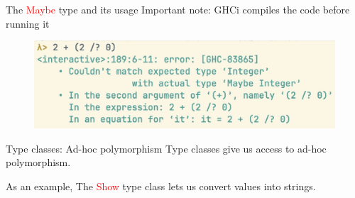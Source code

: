\documentclass[pdf]{beamer}
\newcommand{\code}[1]{\textcolor{Red}{\textsf{#1}}}
\begin{document}
\begin{frame}{The \code{Maybe} type and its usage}
  Important note: GHCi compiles the code before running it
\begin{figure}[H]
    \centering
    \includegraphics[width=\textwidth]{safeDivision}
  \end{figure}
\end{frame}

\begin{frame}{Type classes: Ad-hoc polymorphism}
  Type classes give us access to ad-hoc polymorphism.

  As an example, The \code{Show} type class lets us convert values into strings.
  \begin{figure}[H]
    \centering
    \hspace{0.1cm}
  \end{figure}
\end{frame}
\end{document}
